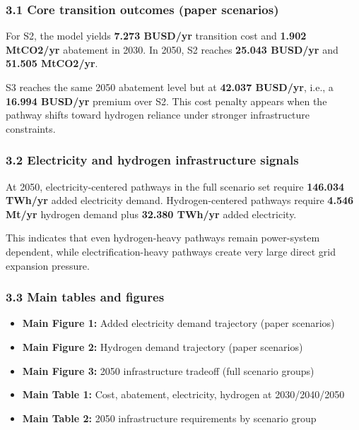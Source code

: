 \documentclass[
]{article}
\providecommand{\tightlist}{%
  \setlength{\itemsep}{0pt}\setlength{\parskip}{0pt}}
\begin{document}
\subsubsection{3.1 Core transition outcomes (paper
scenarios)}\label{31-core-transition-outcomes-paper-scenarios}

For S2, the model yields \textbf{7.273 BUSD/yr} transition cost and
\textbf{1.902 MtCO2/yr} abatement in 2030. In 2050, S2 reaches
\textbf{25.043 BUSD/yr} and \textbf{51.505 MtCO2/yr}.

S3 reaches the same 2050 abatement level but at \textbf{42.037 BUSD/yr},
i.e., a \textbf{16.994 BUSD/yr} premium over S2. This cost penalty
appears when the pathway shifts toward hydrogen reliance under stronger
infrastructure constraints.

\subsubsection{3.2 Electricity and hydrogen infrastructure
signals}\label{32-electricity-and-hydrogen-infrastructure-signals}

At 2050, electricity-centered pathways in the full scenario set require
\textbf{146.034 TWh/yr} added electricity demand. Hydrogen-centered
pathways require \textbf{4.546 Mt/yr} hydrogen demand plus
\textbf{32.380 TWh/yr} added electricity.

This indicates that even hydrogen-heavy pathways remain power-system
dependent, while electrification-heavy pathways create very large direct
grid expansion pressure.

\subsubsection{3.3 Main tables and
figures}\label{33-main-tables-and-figures}

\begin{itemize}
\tightlist
\item
  \textbf{Main Figure 1:} Added electricity demand trajectory (paper
  scenarios)
\item
  \textbf{Main Figure 2:} Hydrogen demand trajectory (paper scenarios)
\item
  \textbf{Main Figure 3:} 2050 infrastructure tradeoff (full scenario
  groups)
\item
  \textbf{Main Table 1:} Cost, abatement, electricity, hydrogen at
  2030/2040/2050
\item
  \textbf{Main Table 2:} 2050 infrastructure requirements by scenario
  group
\end{itemize}
\end{document}
